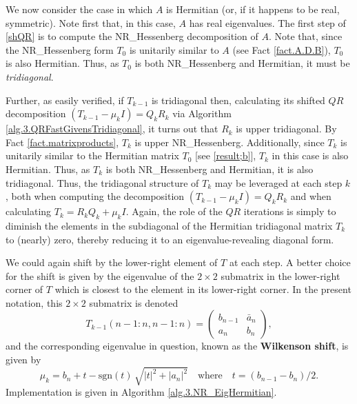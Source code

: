 
\noindent We now consider the case in which $A$ is Hermitian (or, if it happens to be real, symmetric).  Note first that, in this case, $A$ has
real eigenvalues.  The first step of \eqref{shQR} is to compute the NR_Hessenberg decomposition of $A$.
Note that, since the NR_Hessenberg form $T_0$ is unitarily similar to $A$ (see Fact \ref{fact.A.D.B}), $T_0$ is also Hermitian.
Thus, as $T_0$ is both NR_Hessenberg and Hermitian, it must be {\it tridiagonal}.

Further, as easily verified, if $T_{k-1}$ is tridiagonal then, calculating its shifted $QR$ decomposition $(T_{k-1}-\mu_k I)={Q}_{k} {R}_{k}$
via Algorithm \ref{alg.3.QRFastGivensTridiagonal}, it turns out that ${R}_{k}$ is upper tridiagonal.
By Fact \ref{fact.matrixproducts}, $T_k$ is upper NR_Hessenberg.
Additionally, since $T_k$ is unitarily similar to the Hermitian matrix $T_0$ [see \eqref{result;b}],
$T_{k}$ in this case is also Hermitian.  Thus, as $T_{k}$ is both NR_Hessenberg and Hermitian, it is also tridiagonal.
Thus, the tridiagonal structure of $T_{k}$ may be leveraged at each step $k$, both when computing the
decomposition $(T_{k-1}-\mu_k I)={Q}_{k} {R}_{k}$ and when calculating $T_{k} = {R}_{k} {Q}_{k} + \mu_k I$.  Again,
the role of the $QR$ iterations is simply to diminish the elements in the subdiagonal of the Hermitian tridiagonal matrix
$T_{k}$ to (nearly) zero, thereby reducing it to an eigenvalue-revealing diagonal form.

We could again shift by the lower-right element of $T$ at each step.  A better choice for the shift is given by the eigenvalue of the $2\times 2$ submatrix in the
lower-right corner of $T$ which is closest to the element in its lower-right corner.  In the present notation, this $2\times 2$ submatrix is denoted
\begin{equation*}
  T_{k-1}(n-1:n,n-1:n) = \begin{pmatrix} b_{n-1} & \bar a_{n} \\ a_{n} & b_n \end{pmatrix},
\end{equation*}
and the corresponding eigenvalue in question, known as the {\bf Wilkenson shift}, is given by
\begin{equation}
  \mu_k = b_n + t - \textrm{sgn}(t)\,\sqrt{|t|^2 + |a_n|^2} \quad \textrm{where} \quad t=(b_{n-1}-b_n)/2.
\end{equation}
Implementation is given in Algorithm \ref{alg.3.NR_EigHermitian}.
\clearpage

